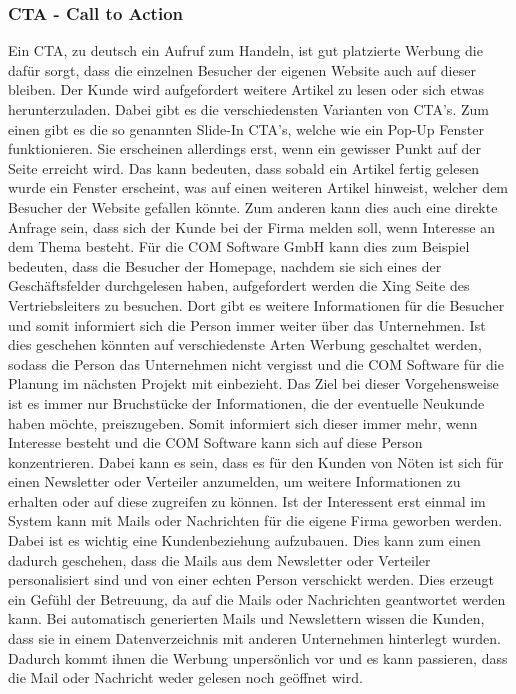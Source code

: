 \subsubsection{CTA - Call to Action}
Ein CTA, zu deutsch ein Aufruf zum Handeln, ist gut platzierte Werbung die dafür sorgt, dass die einzelnen Besucher der eigenen Website auch auf dieser bleiben. Der Kunde wird aufgefordert weitere Artikel zu lesen oder sich etwas herunterzuladen. Dabei gibt es die verschiedensten Varianten von CTA's. 
\newline
Zum einen gibt es die so genannten Slide-In CTA's, welche wie ein Pop-Up Fenster funktionieren. Sie erscheinen allerdings erst, wenn ein gewisser Punkt auf der Seite erreicht wird. Das kann bedeuten, dass sobald ein Artikel fertig gelesen wurde ein Fenster erscheint, was auf einen weiteren Artikel hinweist, welcher dem Besucher der Website gefallen könnte. Zum anderen kann dies auch eine direkte Anfrage sein, dass sich der Kunde bei der Firma melden soll, wenn Interesse an dem Thema besteht. 
\newline
Für die COM Software GmbH kann dies zum Beispiel bedeuten, dass die Besucher der Homepage, nachdem sie sich eines der Geschäftsfelder durchgelesen haben, aufgefordert werden die Xing Seite des Vertriebsleiters zu besuchen. Dort gibt es weitere Informationen für die Besucher und somit informiert sich die Person immer weiter über das Unternehmen. Ist dies geschehen könnten auf verschiedenste Arten Werbung geschaltet werden, sodass die Person das Unternehmen nicht vergisst und die COM Software für die Planung im nächsten Projekt mit einbezieht. 
\newline 
Das Ziel bei dieser Vorgehensweise ist es immer nur Bruchstücke der Informationen, die der eventuelle Neukunde haben möchte, preiszugeben. Somit informiert sich dieser immer mehr, wenn Interesse besteht und die COM Software kann sich auf diese Person konzentrieren. Dabei kann es sein, dass es für den Kunden von Nöten ist sich für einen Newsletter oder Verteiler anzumelden, um weitere Informationen zu erhalten oder auf diese zugreifen zu können. Ist der Interessent erst einmal im System kann mit Mails oder Nachrichten für die eigene Firma geworben werden. Dabei ist es wichtig eine Kundenbeziehung aufzubauen. Dies kann zum einen dadurch geschehen, dass die Mails aus dem Newsletter oder Verteiler personalisiert sind und von einer echten Person verschickt werden. Dies erzeugt ein Gefühl der Betreuung, da auf die Mails oder Nachrichten geantwortet werden kann. Bei automatisch generierten Mails und Newslettern wissen die Kunden, dass sie in einem Datenverzeichnis mit anderen Unternehmen hinterlegt wurden. Dadurch kommt ihnen die Werbung unpersönlich vor und es kann passieren, dass die Mail oder Nachricht weder gelesen noch geöffnet wird. 

